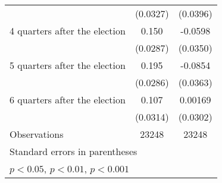 \begin{table}[htbp]
\begin{tabular}{l*{2}{c}}
                    &    (0.0327)         &    (0.0396)         \\
[1em]
 4 quarters after the election&       0.150\sym{***}&     -0.0598         \\
                    &    (0.0287)         &    (0.0350)         \\
[1em]
 5 quarters after the election&       0.195\sym{***}&     -0.0854\sym{*}  \\
                    &    (0.0286)         &    (0.0363)         \\
[1em]
 6 quarters after the election&       0.107\sym{***}&     0.00169         \\
                    &    (0.0314)         &    (0.0302)         \\
\hline
Observations        &       23248         &       23248         \\
\hline\hline
\multicolumn{3}{l}{\footnotesize Standard errors in parentheses}\\
\multicolumn{3}{l}{\footnotesize \sym{*} \(p<0.05\), \sym{**} \(p<0.01\), \sym{***} \(p<0.001\)}\\
\end{tabular}
\end{table}
